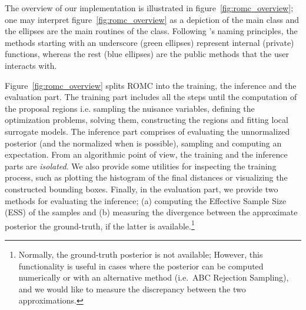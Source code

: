 The overview of our implementation is illustrated in
figure~\ref{fig:romc_overview}; one may interpret
figure~\ref{fig:romc_overview} as a depiction of the main class and
the ellipses are the main routines of the class. Following
's naming principles, the methods starting with an
underscore (green ellipses) represent internal (private) functions,
whereas the rest (blue ellipses) are the public methods that the user
interacts with.

Figure~\ref{fig:romc_overview} splits ROMC into the training, the
inference and the evaluation part. The training part includes all the
steps until the computation of the proposal regions i.e. sampling the
nuisance variables, defining the optimization problems, solving them,
constructing the regions and fitting local surrogate models. The
inference part comprises of evaluating the unnormalized posterior (and
the normalized when is possible), sampling and computing an
expectation. From an algorithmic point of view, the training and the
inference parts are \emph{isolated}. We also provide some utilities
for inspecting the training process, such as plotting the histogram of
the final distances or visualizing the constructed bounding
boxes. Finally, in the evaluation part, we provide two methods for
evaluating the inference; (a) computing the Effective Sample Size
(ESS) of the samples and (b) measuring the divergence between the
approximate posterior the ground-truth, if the latter is
available.\footnote{Normally, the ground-truth posterior is not
  available; However, this functionality is useful in cases where the
  posterior can be computed numerically or with an alternative method
  (i.e.\ ABC Rejection Sampling), and we would like to measure the
  discrepancy between the two approximations.}


